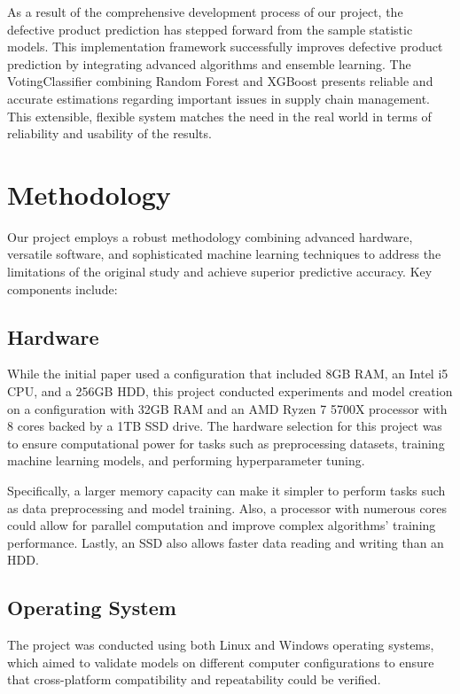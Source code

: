 \documentclass[conference]{IEEEtran}
\begin{document}
As a result of the comprehensive development process of our project, the defective product prediction has stepped forward from the sample statistic models. This implementation framework successfully improves defective product prediction by integrating advanced algorithms and ensemble learning. The VotingClassifier combining Random Forest and XGBoost presents reliable and accurate estimations regarding important issues in supply chain management. This extensible, flexible system matches the need in the real world in terms of reliability and usability of the results.



\section{Methodology}
Our project employs a robust methodology combining advanced hardware, versatile software, and sophisticated machine learning techniques to address the limitations of the original study and achieve superior predictive accuracy. Key components include:

\subsection{Hardware}

While the initial paper used a configuration that included 8GB RAM, an Intel i5 CPU, and a 256GB HDD, this project conducted experiments and model creation on a configuration with 32GB RAM and an AMD Ryzen 7 5700X processor with 8 cores backed by a 1TB SSD drive. The hardware selection for this project was to ensure computational power for tasks such as preprocessing datasets, training machine learning models, and performing hyperparameter tuning.

Specifically, a larger memory capacity can make it simpler to perform tasks such as data preprocessing and model training. Also, a processor with numerous cores could allow for parallel computation and improve complex algorithms' training performance. Lastly, an SSD also allows faster data reading and writing than an HDD.

\subsection{Operating System}

The project was conducted using both Linux and Windows operating systems, which aimed to validate models on different computer configurations to ensure that cross-platform compatibility and repeatability could be verified.
\end{document}
